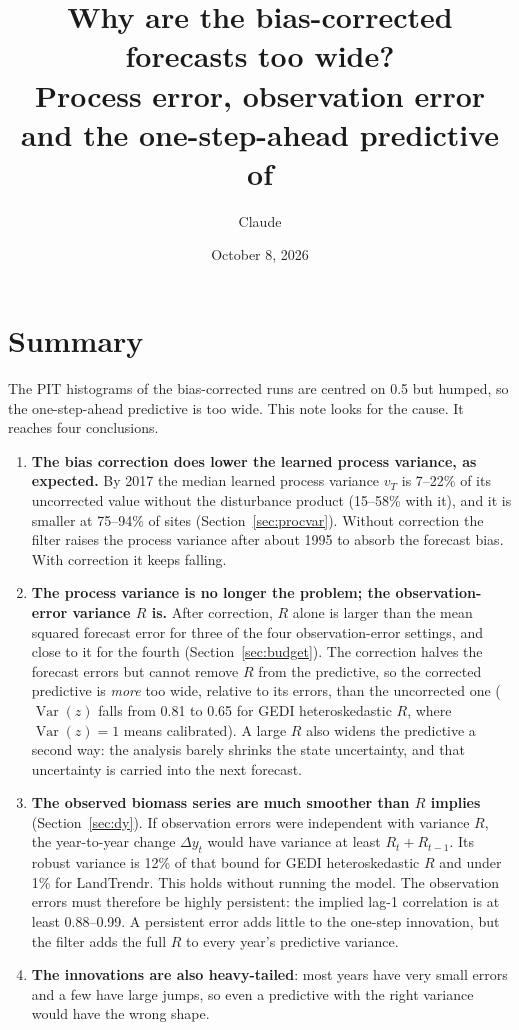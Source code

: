 \documentclass[11pt]{article}
\title{Why are the bias-corrected forecasts too wide?\\
       Process error, observation error and the one-step-ahead predictive
       of \code{ORJointUpdate}}
\author{Claude}
\date{October 8, 2026}
\newcommand{\Var}{\operatorname{Var}}
\begin{document}
\maketitle

\section*{Summary}

The PIT histograms of the bias-corrected runs are centred on 0.5 but humped, so the
one-step-ahead predictive is too wide. This note looks for the cause. It reaches four conclusions.

\begin{enumerate}
  \item \textbf{The bias correction does lower the learned process variance, as expected.} By
  2017 the median learned process variance $v_T$ is 7--22\% of its uncorrected value without the disturbance
  product (15--58\% with it), and it is smaller at 75--94\% of sites
  (Section~\ref{sec:procvar}). Without correction the filter raises the process variance after
  about 1995 to absorb the forecast bias. With correction it keeps falling.
  \item \textbf{The process variance is no longer the problem; the observation-error variance $R$ is.}
  After correction, $R$ alone is larger than the mean squared forecast error for three
  of the four observation-error settings, and close to it for the fourth
  (Section~\ref{sec:budget}). The correction halves the forecast errors but cannot remove $R$
  from the predictive, so the corrected predictive is \emph{more} too wide, relative to its
  errors, than the uncorrected one ($\Var(z)$ falls from 0.81 to 0.65 for GEDI
  heteroskedastic $R$, where $\Var(z)=1$ means calibrated). A large $R$ also widens the predictive a second way:
  the analysis barely shrinks the state uncertainty, and that uncertainty is carried
  into the next forecast.
  \item \textbf{The observed biomass series are much smoother than $R$ implies}
  (Section~\ref{sec:dy}). If observation errors were independent with variance $R$, the
  year-to-year change $\Delta y_t$ would have variance at least $R_t + R_{t-1}$. Its robust variance is 12\% of that
  bound for GEDI heteroskedastic $R$ and under 1\% for LandTrendr. This holds without running the
  model. The observation errors must therefore be highly persistent: the implied lag-1
  correlation is at least 0.88--0.99. A persistent error adds little to the
  one-step innovation, but the filter adds the full $R$ to every year's predictive variance.
  \item \textbf{The innovations are also heavy-tailed}: most years have very small errors and a few
  have large jumps, so even a predictive with the right variance would have the wrong shape.
\end{enumerate}
\end{document}

